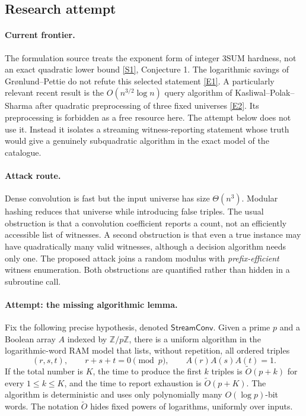 \documentclass[11pt,a4paper]{article}
\newcommand{\Z}{\mathbb{Z}}
\newcommand{\sref}[2]{\hyperlink{source:#1:#2}{[S#2]}}
\newcommand{\eref}[2]{\hyperlink{extra:#1:#2}{[E#2]}}
\numberwithin{equation}{section}
\begin{document}
\subsection{Research attempt}

\paragraph{Current frontier.}
The formulation source treats the exponent form of integer 3SUM hardness,
not an exact quadratic lower bound \sref{statement}{1}, Conjecture 1. The
logarithmic savings of Gr\o nlund--Pettie do not refute this selected
statement \eref{statement}{1}. A particularly relevant recent result is the
$O(n^{3/2}\log n)$ query algorithm of Kasliwal--Polak--Sharma after
quadratic preprocessing of three fixed universes
\eref{statement}{2}. Its preprocessing is forbidden as a free resource here.
The attempt below does not use it. Instead it isolates a streaming
witness-reporting statement whose truth would give a genuinely
subquadratic algorithm in the exact model of the catalogue.

\paragraph{Attack route.}
Dense convolution is fast but the input universe has size $\Theta(n^3)$.
Modular hashing reduces that universe while introducing false triples.
The usual obstruction is that a convolution coefficient reports a count,
not an efficiently accessible list of witnesses. A second obstruction is
that even a true instance may have quadratically many valid witnesses,
although a decision algorithm needs only one. The proposed attack joins a
random modulus with \emph{prefix-efficient} witness enumeration. Both
obstructions are quantified rather than hidden in a subroutine call.

\paragraph{Attempt: the missing algorithmic lemma.}
Fix the following precise hypothesis, denoted $\mathsf{StreamConv}$.
Given a prime $p$ and a Boolean array $A$ indexed by $\Z/p\Z$, there is a
uniform algorithm in the logarithmic-word RAM model that lists, without
repetition, all ordered triples
\begin{equation}\label{statement:residue-triples}
 (r,s,t),\qquad r+s+t=0\pmod p,\qquad A(r)A(s)A(t)=1.
\end{equation}
If the total number is $K$, the time to produce the first $k$ triples is
$\widetilde O(p+k)$ for every $1\le k\le K$, and the time to report
exhaustion is $\widetilde O(p+K)$. The algorithm is deterministic and uses
only polynomially many $O(\log p)$-bit words. The notation
$\widetilde O$ hides fixed powers of logarithms, uniformly over inputs.
\end{document}
